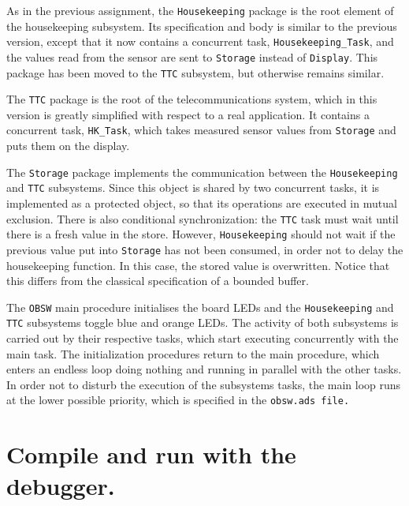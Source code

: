 As in the previous assignment, the {\tt Housekeeping} package is the root element of the housekeeping subsystem. Its specification and body is similar to the previous version, except that it now contains a concurrent task, {\tt Housekeeping\_Task}, and the values read from the sensor are sent to {\tt Storage} instead of {\tt Display}. This package has been moved to the {\tt TTC} subsystem, but otherwise remains similar.

The {\tt TTC} package is the root of the telecommunications system, which in this version is greatly simplified with respect to a real application. It contains a concurrent task, {\tt HK\_Task}, which takes measured sensor values from {\tt Storage} and puts them on the display.

The {\tt Storage} package implements the communication between the {\tt Housekeeping} and {\tt TTC} subsystems.  Since this object is shared by two concurrent tasks, it is implemented as a protected object, so that its operations are executed in mutual exclusion. There is also conditional synchronization: the {\tt TTC} task must wait until there is a fresh value in the store. However, {\tt Housekeeping} should not wait if the previous value put into {\tt Storage} has not been consumed, in order not to delay the housekeeping function. In this case, the stored value is overwritten. Notice that this differs from the classical specification of a bounded buffer.

The {\tt OBSW} main procedure initialises the board LEDs and the {\tt Housekeeping} and {\tt TTC} subsystems toggle blue and orange LEDs.  The activity of both subsystems is carried out by their respective tasks, which start executing concurrently with the main task. The initialization procedures return to the main procedure, which enters an endless loop doing nothing and running in parallel with the other tasks. In order not to disturb the execution of the subsystems tasks, the main loop runs at the lower possible priority, which is specified in the {\tt obsw.ads file.}

\section{Compile and run with the debugger.}

